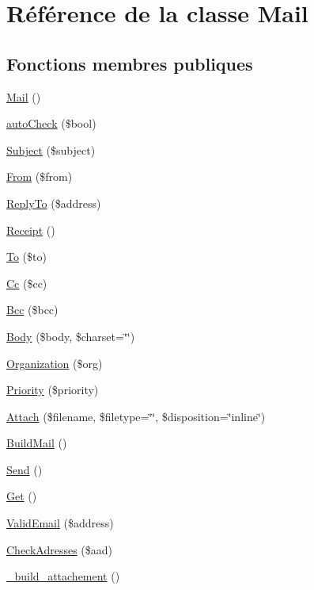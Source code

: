 \hypertarget{classMail}{
\section{R\'{e}f\'{e}rence de la classe Mail}
\label{classMail}
}
\subsection*{Fonctions membres publiques}
\begin{CompactItemize}
\item 
\hyperlink{classMail_a0}{Mail} ()
\item 
\hyperlink{classMail_a1}{auto\-Check} (\$bool)
\item 
\hyperlink{classMail_a2}{Subject} (\$subject)
\item 
\hyperlink{classMail_a3}{From} (\$from)
\item 
\hyperlink{classMail_a4}{Reply\-To} (\$address)
\item 
\hyperlink{classMail_a5}{Receipt} ()
\item 
\hyperlink{classMail_a6}{To} (\$to)
\item 
\hyperlink{classMail_a7}{Cc} (\$cc)
\item 
\hyperlink{classMail_a8}{Bcc} (\$bcc)
\item 
\hyperlink{classMail_a9}{Body} (\$body, \$charset=\char`\"{}\char`\"{})
\item 
\hyperlink{classMail_a10}{Organization} (\$org)
\item 
\hyperlink{classMail_a11}{Priority} (\$priority)
\item 
\hyperlink{classMail_a12}{Attach} (\$filename, \$filetype=\char`\"{}\char`\"{}, \$disposition=\char`\"{}inline\char`\"{})
\item 
\hyperlink{classMail_a13}{Build\-Mail} ()
\item 
\hyperlink{classMail_a14}{Send} ()
\item 
\hyperlink{classMail_a15}{Get} ()
\item 
\hyperlink{classMail_a16}{Valid\-Email} (\$address)
\item 
\hyperlink{classMail_a17}{Check\-Adresses} (\$aad)
\item 
\hyperlink{classMail_a18}{\_\-build\_\-attachement} ()
\end{CompactItemize}
